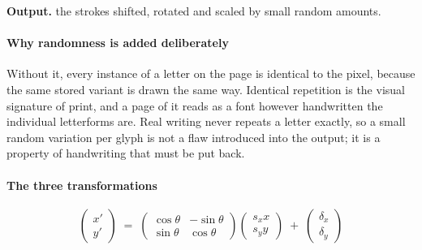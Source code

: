 \noindent\textbf{Output.} the strokes shifted, rotated and scaled by small random amounts.


\paragraph{Why randomness is added deliberately}
Without it, every instance of a letter on the page is identical to the pixel, because the same stored variant is drawn the same way. Identical repetition is the visual signature of print, and a page of it reads as a font however handwritten the individual letterforms are. Real writing never repeats a letter exactly, so a small random variation per glyph is not a flaw introduced into the output; it is a property of handwriting that must be put back.


\paragraph{The three transformations}

\begin{equation}
\begin{pmatrix} x' \\ y' \end{pmatrix} \;=\; \begin{pmatrix} \cos\theta & -\sin\theta \\ \sin\theta & \cos\theta \end{pmatrix} \begin{pmatrix} s_x x \\ s_y y \end{pmatrix} \;+\; \begin{pmatrix} \delta_x \\ \delta_y \end{pmatrix}
\end{equation}

